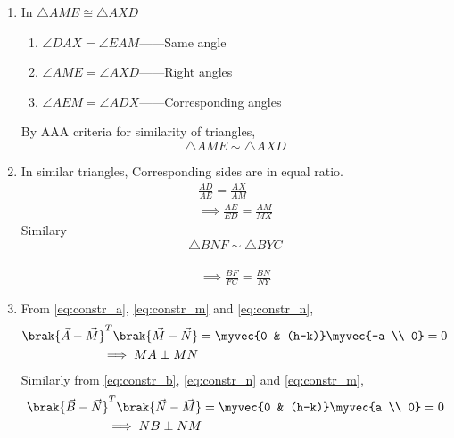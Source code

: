\renewcommand{\theequation}{\theenumi}
\begin{enumerate}[label=\thesection.\arabic*.,ref=\thesection.\theenumi]
	
\item In $\triangle AME \cong \triangle AXD$  
\begin{enumerate}
\item $\angle DAX = \angle EAM $------Same angle
\item $\angle AME = \angle AXD $------Right angles
\item  $\angle AEM = \angle ADX $------Corresponding angles
\end{enumerate}
%
By AAA criteria for similarity of triangles,
 $$\triangle AME \sim \triangle AXD$$
\item  In similar triangles, Corresponding sides are in equal ratio.
\begin{align}
\frac{AD} {AE} = \frac{AX} {AM}
\\
\implies \frac {AE}{ED} = \frac {AM} {MX}
\label{eq:sim1}
\end{align}
Similary
$$\triangle BNF \sim \triangle BYC$$\\

\begin{align}
 \implies \frac {BF}{FC} = \frac {BN} {NY}
\label{eq:sim2}
\end{align}

\item From \eqref{eq:constr_a}, \eqref{eq:constr_m} and \eqref{eq:constr_n},
%
%
\begin{align}
\brak{\vec{A}-\vec{M}}^T
\brak{\vec{M}-\vec{N}} &= \myvec{0 & (h-k)}\myvec{-a \\ 0} = 0
\\
\implies MA \perp MN
\label{eq:perp1}
\end{align}
%
Similarly from \eqref{eq:constr_b}, \eqref{eq:constr_n} and \eqref{eq:constr_m},
%
%
\begin{align}
\brak{\vec{B}-\vec{N}}^T
\brak{\vec{N}-\vec{M}} &= \myvec{0 & (h-k)}\myvec{a \\ 0} = 0
\\
\implies NB \perp NM
\label{eq:perp2}
\end{align}
%



\end{enumerate}
